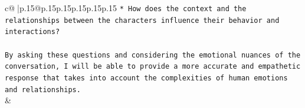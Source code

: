 \documentclass{article}
\begin{document}
{\begin{supertabular}{c@{$\;$}|p{.15\linewidth}@{}p{.15\linewidth}p{.15\linewidth}p{.15\linewidth}p{.15\linewidth}p{.15\linewidth}}
{{{\texttt{* How does the context and the relationships between the characters influence their behavior and interactions?} \\
\\ 
\texttt{By asking these questions and considering the emotional nuances of the conversation, I will be able to provide a more accurate and empathetic response that takes into account the complexities of human emotions and relationships.} \\
            }
        }
    }
    & \\ \\

\end{supertabular}
}
\end{document}
